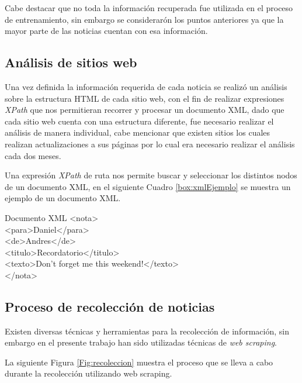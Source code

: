 Cabe destacar que no toda la información recuperada fue utilizada en el proceso de entrenamiento, sin embargo se considerarón los puntos anteriores ya que la mayor parte de las noticias cuentan con esa información.


\subsection{Análisis de sitios web}

Una vez definida la información requerida de cada noticia se realizó un análisis sobre la estructura HTML de cada sitio web, con el fin de realizar expresiones \textit{XPath} que nos permitieran recorrer y procesar un documento XML, dado que cada sitio web cuenta con una estructura diferente, fue necesario realizar el análisis de manera individual, cabe mencionar que existen sitios los cuales realizan actualizaciones a sus páginas por lo cual era necesario realizar el análisis cada dos meses.

Una expresión \textit{XPath} de ruta nos permite buscar y seleccionar los distintos nodos de un documento XML, en el siguiente Cuadro \ref{box:xmlEjemplo} se muestra un ejemplo de un documento XML.

\begin{mygraybox}[label={box:xmlEjemplo}]{Documento XML} 
<nota>\\
	<para>Daniel</para>\\
	<de>Andres</de>\\
	<titulo>Recordatorio</titulo>\\
	<texto>Don't forget me this weekend!</texto>\\
</nota>
\end{mygraybox}

\subsection{Proceso de recolección de noticias}

Existen diversas técnicas y herramientas para la recolección de información, sin embargo en el presente trabajo han sido utilizadas técnicas de \textit{web scraping}.

La siguiente Figura \ref{Fig:recoleccion} muestra el proceso que se lleva a cabo durante la recolección utilizando web scraping.


